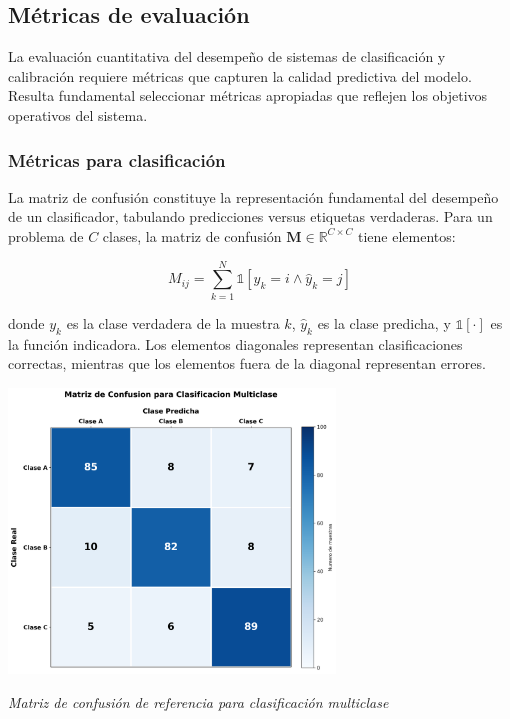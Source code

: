\subsection{Métricas de evaluación}

La evaluación cuantitativa del desempeño de sistemas de clasificación y calibración requiere métricas que capturen la calidad predictiva del modelo. Resulta fundamental seleccionar métricas apropiadas que reflejen los objetivos operativos del sistema.

\subsubsection{Métricas para clasificación}

La matriz de confusión constituye la representación fundamental del desempeño de un clasificador, tabulando predicciones versus etiquetas verdaderas. Para un problema de $C$ clases, la matriz de confusión $\mathbf{M} \in \mathbb{R}^{C \times C}$ tiene elementos:

\begin{equation}
M_{ij} = \sum_{k=1}^{N} \mathbb{1}[y_k = i \land \hat{y}_k = j]
\end{equation}

donde $y_k$ es la clase verdadera de la muestra $k$, $\hat{y}_k$ es la clase predicha, y $\mathbb{1}[\cdot]$ es la función indicadora. Los elementos diagonales representan clasificaciones correctas, mientras que los elementos fuera de la diagonal representan errores.

\begin{table}[h]
\centering
\includegraphics[width=0.65\textwidth]{imagenes/matriz_confusion_ejemplo.png}
\caption{\textit{Matriz de confusión de referencia para clasificación multiclase}}
\label{fig:matriz_confusion}
\end{table}

